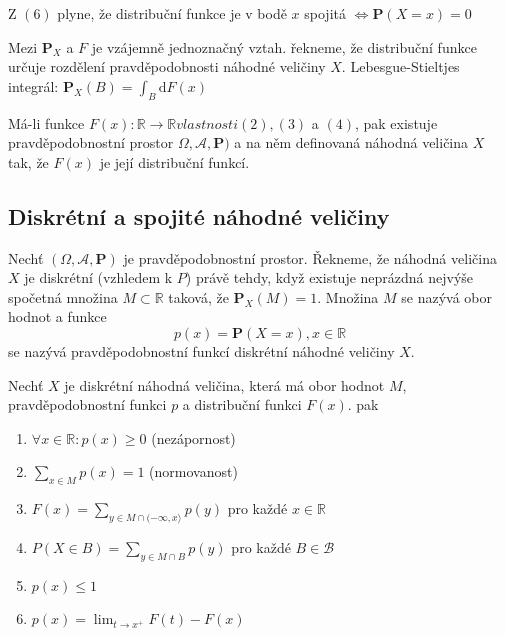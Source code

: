 \begin{notes}
Z $(6)$ plyne, že distribuční funkce je v bodě $x$ spojitá $\Leftrightarrow \textbf{P}(X=x)=0$ 
\end{notes}


\begin{notes}
Mezi $\textbf{P}_X$ a $F$ je vzájemně jednoznačný vztah. řekneme, že distribuční funkce určuje rozdělení pravděpodobnosti náhodné veličiny $X$. Lebesgue-Stieltjes integrál: $\textbf{P}_X(B)=\int_B \mathrm{d}F(x)$
\end{notes}

\begin{theorem}
Má-li funkce $F(x):\mathbb{R}\rightarrow \mathbb{R} vlastnosti (2),(3) $ a $(4)$, pak existuje pravděpodobnostní prostor $\Omega,\mathcal{A},\textbf{P})$ a na něm definovaná náhodná veličina $X$ tak, že $F(x)$ je její distribuční funkcí.
\end{theorem}



\subsection{Diskrétní a spojité náhodné veličiny}
\begin{definition}
Nechť $(\Omega,\mathcal{A},\textbf{P})$ je pravděpodobnostní prostor.  Řekneme, že náhodná veličina $X$ je diskrétní (vzhledem k $P$) právě tehdy, když existuje neprázdná nejvýše spočetná množina $M \subset \mathbb{R}$ taková, že $\textbf{P}_X(M)=1$. Množina $M$ se nazývá obor hodnot a funkce \begin{equation}
p(x)=\textbf{P}(X=x),x\in \mathbb{R}
\end{equation}
se nazývá pravděpodobnostní funkcí diskrétní náhodné veličiny $X$.
\end{definition}

\begin{theorem}
Nechť $X$ je diskrétní náhodná veličina, která má obor hodnot $M$, pravděpodobnostní funkci $p$ a distribuční funkci $F(x)$. pak
\begin{enumerate}
\item $\forall x \in \mathbb{R}: p(x)\geq 0$ (nezápornost)
\item $\sum_{x\in M} p(x) =1$ (normovanost)
\item $F(x)=\sum_{y\in M \cap (-\infty,x\rangle } p(y) $ pro každé $x \in \mathbb{R}$
\item $P(X\in B)=\sum_{y\in M \cap B } p(y) $ pro každé $B \in \mathcal{B}$
\item $p(x) \leq 1$
\item $p(x)= \lim_{t\rightarrow x^+ }F(t)-F(x)$

\end{enumerate}
\end{theorem}

